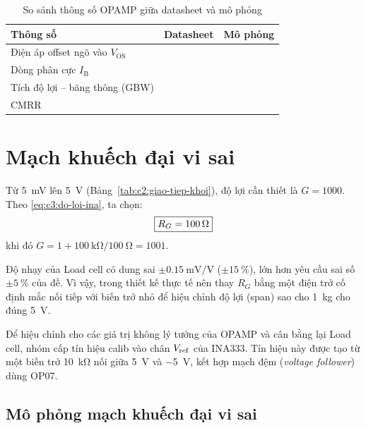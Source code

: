 \begin{table}[H]
    \centering
    \caption{So sánh thông số OPAMP giữa datasheet và mô phỏng}
    \label{tab:c3:opamp-datasheet}
    \renewcommand{\arraystretch}{1.3}
    \begin{tabular}{|l|c|c|}
        \hline
        \textbf{Thông số} & \textbf{Datasheet} & \textbf{Mô phỏng} \\ \hline
        Điện áp offset ngõ vào $V_{\mathrm{OS}}$ & \TODO{} & \TODO{} \\ \hline
        Dòng phân cực $I_{\mathrm{B}}$           & \TODO{} & \TODO{} \\ \hline
        Tích độ lợi -- băng thông (GBW)          & \TODO{} & \TODO{} \\ \hline
        CMRR                                     & \TODO{} & \TODO{} \\ \hline
    \end{tabular}
\end{table}

\section{Mạch khuếch đại vi sai}
\label{sec:c3:khuech-dai}

Từ \qty{5}{\milli\volt} lên \qty{5}{\volt} (Bảng~\ref{tab:c2:giao-tiep-khoi}), độ lợi cần thiết là
$G = 1000$. Theo \eqref{eq:c3:do-loi-ina}, ta chọn:
\[
    \boxed{R_G = \qty{100}{\ohm}}
\]
khi đó $G = 1 + \qty{100}{\kilo\ohm}/\qty{100}{\ohm} = 1001$.

Độ nhạy của Load cell có dung sai $\pm\qty{0.15}{\milli\volt\per\volt}$ ($\pm\qty{15}{\percent}$), lớn hơn
yêu cầu sai số $\pm\qty{5}{\percent}$ của đề. Vì vậy, trong thiết kế thực tế nên thay $R_G$ bằng một điện
trở cố định mắc nối tiếp với biến trở nhỏ để hiệu chỉnh độ lợi (span) sao cho \qty{1}{\kilo\gram} cho
đúng \qty{5}{\volt}.

Để hiệu chỉnh cho các giá trị không lý tưởng của OPAMP và cân bằng lại Load cell, nhóm cấp tín hiệu
calib vào chân $V_{\mathrm{ref}}$ của INA333. Tín hiệu này được tạo từ một biến trở \qty{10}{\kilo\ohm} nối giữa
\qty{+5}{\volt} và \qty{-5}{\volt}, kết hợp mạch đệm (\textit{voltage follower}) dùng OP07.

\subsection{Mô phỏng mạch khuếch đại vi sai}
\label{sec:c3:mo-phong-khuech-dai}

